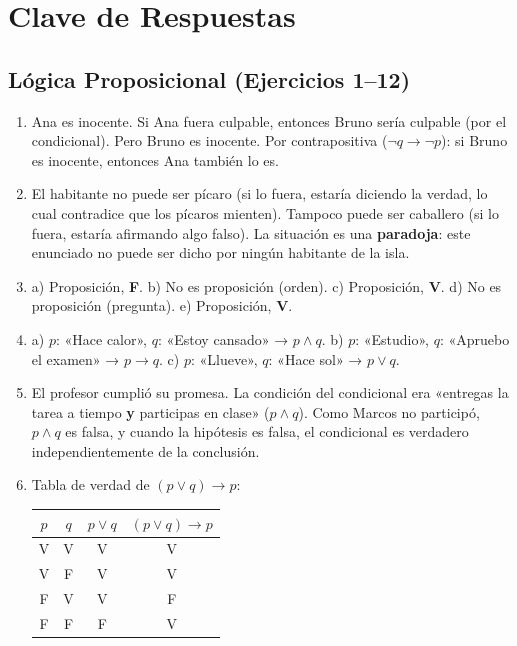 \documentclass[12pt, a4paper]{article}
\begin{document}
\newpage

\section{Clave de Respuestas}

\subsection*{Lógica Proposicional (Ejercicios 1--12)}

\begin{enumerate}[leftmargin=*, label=\textbf{\arabic*.}]
  \item Ana es inocente. Si Ana fuera culpable, entonces Bruno sería culpable (por el condicional). Pero Bruno es inocente. Por contrapositiva ($\neg q \rightarrow \neg p$): si Bruno es inocente, entonces Ana también lo es.

  \item El habitante no puede ser pícaro (si lo fuera, estaría diciendo la verdad, lo cual contradice que los pícaros mienten). Tampoco puede ser caballero (si lo fuera, estaría afirmando algo falso). La situación es una \textbf{paradoja}: este enunciado no puede ser dicho por ningún habitante de la isla.

  \item a) Proposición, \textbf{F}. \quad b) No es proposición (orden). \quad c) Proposición, \textbf{V}. \quad d) No es proposición (pregunta). \quad e) Proposición, \textbf{V}.

  \item a) $p$: «Hace calor», $q$: «Estoy cansado» → $p \wedge q$. \quad b) $p$: «Estudio», $q$: «Apruebo el examen» → $p \rightarrow q$. \quad c) $p$: «Llueve», $q$: «Hace sol» → $p \vee q$.

  \item El profesor cumplió su promesa. La condición del condicional era «entregas la tarea a tiempo \textbf{y} participas en clase» ($p \wedge q$). Como Marcos no participó, $p \wedge q$ es falsa, y cuando la hipótesis es falsa, el condicional es verdadero independientemente de la conclusión.

  \item Tabla de verdad de $(p \vee q) \rightarrow p$:
  \begin{center}
  \small
  \begin{tabular}{cc|c|c}
  $p$ & $q$ & $p \vee q$ & $(p \vee q) \rightarrow p$ \\
  \hline
  V & V & V & V \\
  V & F & V & V \\
  F & V & V & F \\
  F & F & F & V \\
  \end{tabular}
  \end{center}


\end{enumerate}
\end{document}
